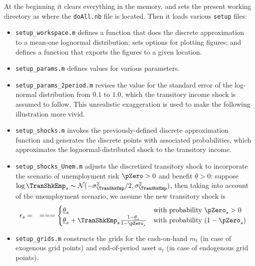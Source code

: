 \documentclass[titlepage,abstract]{\econtex}
\providecommand{\thetaMin}{\underline{\theta}}
\begin{document}
At the beginning it clears everything in the memory, and sets the present working directory as where the \texttt{doAll.nb} file is located. Then it loads various \texttt{setup} files:
\begin{itemize}
      \item \texttt{setup\_workspace.m} defines a function that does the discrete approximation to a mean-one lognormal distribution; sets options for plotting figures; and defines a function that exports the figures to a given location.
      \item \texttt{setup\_params.m} defines values for various parameters.
      \item \texttt{setup\_params\_2period.m} revises the value for the standard error of the log-normal distribution from $0.1$ to $1.0$, which the transitory income shock is assumed to follow. This unrealistic exaggeration is used to make the following illustration more vivid.
      \item \texttt{setup\_shocks.m} invokes the previously-defined discrete approximation function and generates the discrete points with associated probabilities, which approximates the lognormal-distributed shock to the transitory income.
      \item \texttt{setup\_shocks\_Unem.m} adjusts the discretized transitory shock to incorporate the scenario of unemployment risk $\pZero>0$ and benefit $\thetaMin>0$: suppose $\log \TranShkEmp_{s}\thicksim \mathcal{N}(-\sigma_{\TranShkEmp}^{2}/2, \sigma_{\TranShkEmp}^{2})$, then taking into account of the unemployment scenario, we assume the new transitory shock is
          \begin{equation}\begin{gathered}\begin{aligned}
          \epsilon_{s}    &=& =  =  =  
          \begin{cases}
            \thetaMin_{s} & \text{with probability $\pZero_{s}>0$} \\
            \thetaMin_{s} + \TranShkEmp_{s}\frac{1-\thetaMin_{s}}{1-\pZero_{s}}  & \text{with probability $(1-\pZero_{s})$}
          \end{cases}
          \end{aligned}\end{gathered}\end{equation}
      \item \texttt{setup\_grids.m} constructs the grids for the cash-on-hand $m_{t}$ (in case of exogenous grid points) and end-of-period asset $a_{t}$ (in case of endogenous grid points).

\end{itemize}
\end{document}
